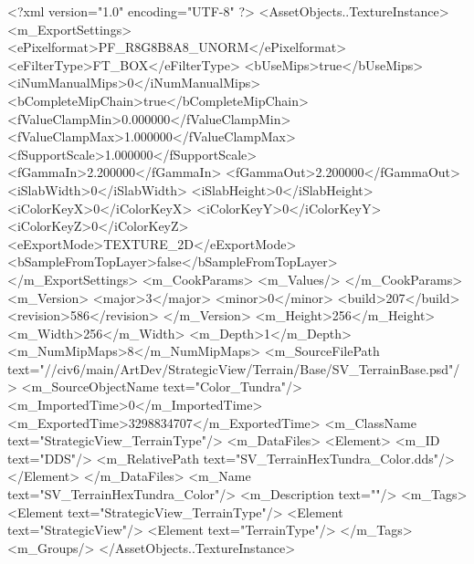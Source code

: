 <?xml version="1.0" encoding="UTF-8" ?>
<AssetObjects..TextureInstance>
	<m_ExportSettings>
		<ePixelformat>PF_R8G8B8A8_UNORM</ePixelformat>
		<eFilterType>FT_BOX</eFilterType>
		<bUseMips>true</bUseMips>
		<iNumManualMips>0</iNumManualMips>
		<bCompleteMipChain>true</bCompleteMipChain>
		<fValueClampMin>0.000000</fValueClampMin>
		<fValueClampMax>1.000000</fValueClampMax>
		<fSupportScale>1.000000</fSupportScale>
		<fGammaIn>2.200000</fGammaIn>
		<fGammaOut>2.200000</fGammaOut>
		<iSlabWidth>0</iSlabWidth>
		<iSlabHeight>0</iSlabHeight>
		<iColorKeyX>0</iColorKeyX>
		<iColorKeyY>0</iColorKeyY>
		<iColorKeyZ>0</iColorKeyZ>
		<eExportMode>TEXTURE_2D</eExportMode>
		<bSampleFromTopLayer>false</bSampleFromTopLayer>
	</m_ExportSettings>
	<m_CookParams>
		<m_Values/>
	</m_CookParams>
	<m_Version>
		<major>3</major>
		<minor>0</minor>
		<build>207</build>
		<revision>586</revision>
	</m_Version>
	<m_Height>256</m_Height>
	<m_Width>256</m_Width>
	<m_Depth>1</m_Depth>
	<m_NumMipMaps>8</m_NumMipMaps>
	<m_SourceFilePath text="//civ6/main/ArtDev/StrategicView/Terrain/Base/SV_TerrainBase.psd"/>
	<m_SourceObjectName text="Color_Tundra"/>
	<m_ImportedTime>0</m_ImportedTime>
	<m_ExportedTime>3298834707</m_ExportedTime>
	<m_ClassName text="StrategicView_TerrainType"/>
	<m_DataFiles>
		<Element>
			<m_ID text="DDS"/>
			<m_RelativePath text="SV_TerrainHexTundra_Color.dds"/>
		</Element>
	</m_DataFiles>
	<m_Name text="SV_TerrainHexTundra_Color"/>
	<m_Description text=""/>
	<m_Tags>
		<Element text="StrategicView_TerrainType"/>
		<Element text="StrategicView"/>
		<Element text="TerrainType"/>
	</m_Tags>
	<m_Groups/>
</AssetObjects..TextureInstance>

